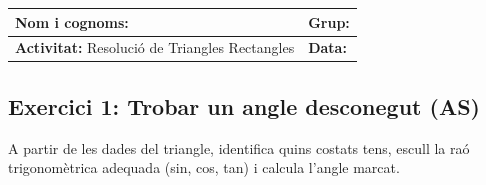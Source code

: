 \documentclass[12pt,a4paper]{article}
\begin{document}
\begingroup
\renewcommand{\arraystretch}{2.2}
\begin{tabularx}{\textwidth}{|X|p{4cm}|}
    \hline
    \textbf{Nom i cognoms:} & \textbf{Grup:} \\ \hline
    \textbf{Activitat:} Resolució de Triangles Rectangles & \textbf{Data:} \\ \hline
\end{tabularx}
\endgroup

\vspace{0.5cm}

\subsection*{Exercici 1: Trobar un angle desconegut (AS)}
A partir de les dades del triangle, identifica quins costats tens, escull la raó trigonomètrica adequada (sin, cos, tan) i calcula l'angle marcat. 

\vspace{0.5cm}
\end{document}
